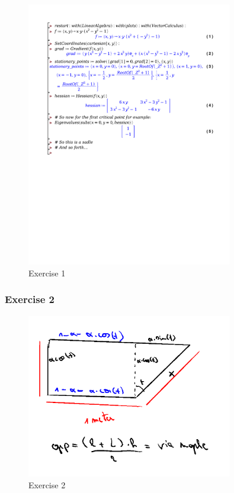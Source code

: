 \documentclass[a4paper]{report}
\begin{document}
\begin{figure}[H]
	\centering
	\includegraphics[width=0.8\textwidth]{exercises/wc_4_ex_1.pdf}
	\caption{Exercise 1}
	\label{fig:word_4_ex_1}
\end{figure}

\subsubsection{Exercise 2}

\begin{figure}[H]
	\centering
	\includegraphics[width=0.8\textwidth]{assets/wc_4_ex_2.png}
	\caption{Exercise 2}
	\label{fig:wc_4_ex_2}
\end{figure}
\end{document}
